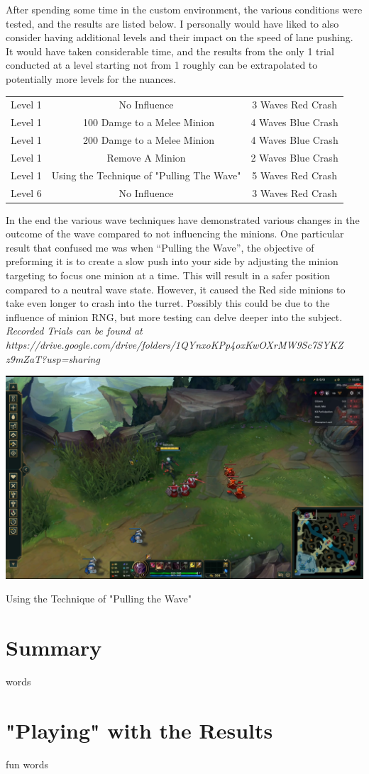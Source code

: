 \documentclass{article}
\begin{document}
After spending some time in the custom environment, the various conditions were tested, and the results are listed below. I personally would have liked to also consider having additional levels and their impact on the speed of lane pushing. It would have taken considerable time, and the results from the only 1 trial conducted at a level starting not from 1 roughly can be extrapolated to potentially more levels for the nuances.
\begin{center}
\begin{tabular}{ c c c}
  Level 1 & No Influence & 3 Waves Red Crash\\ 
  Level 1 & ~100 Damge to  a Melee Minion & 4 Waves Blue Crash\\  
  Level 1 & ~200 Damge to  a Melee Minion & 4 Waves Blue Crash\\  
  Level 1 & Remove A Minion & 2 Waves Blue Crash\\  
  Level 1 & Using the Technique of "Pulling The Wave"  & 5 Waves Red Crash\\
  Level 6 & No Influence  & 3 Waves Red Crash
\end{tabular}
\end{center}
In the end the various wave techniques have demonstrated various changes in the outcome of the wave compared to not influencing the minions. One particular result that confused me was when “Pulling the Wave”, the objective of preforming it is to create a slow push into your side by adjusting the minion targeting to focus one minion at a time. This will result in a safer position compared to a neutral wave state. However, it caused the Red side minions to take even longer to crash into the turret. Possibly this could be due to the influence of minion RNG, but more testing can delve deeper into the subject.
\textit{Recorded Trials can be found at https://drive.google.com/drive/folders/1QYnxoKPp4oxKwOXrMW9Sc7SYKZ\\z9mZaT?usp=sharing}
\begin{table}[h]
  \includegraphics[width=\textwidth]{PullingTheWave.PNG}
  \caption[Pulling the Wave]{Using the Technique of "Pulling the Wave"}
  \end{table}

\newpage
\section{Summary}
words\\


\newpage
\section{"Playing" with the Results}
fun words
\end{document}
